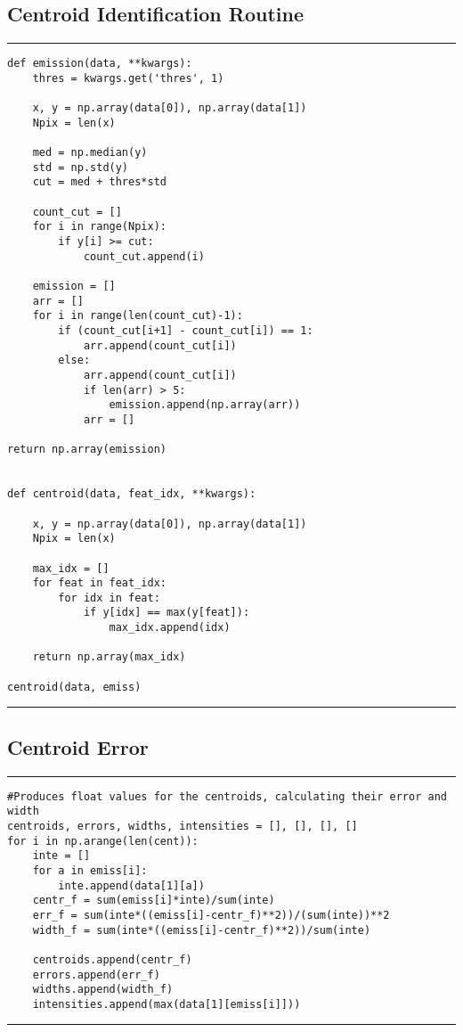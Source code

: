 \documentclass[preprint]{aastex62}
\begin{document}
\subsection{Centroid Identification Routine} \label{code:stats}
\small
\hrule
\begin{lstlisting}
def emission(data, **kwargs):
    thres = kwargs.get('thres', 1)
    
    x, y = np.array(data[0]), np.array(data[1])
    Npix = len(x)
    
    med = np.median(y)
    std = np.std(y)
    cut = med + thres*std
    
    count_cut = []
    for i in range(Npix):
        if y[i] >= cut:
            count_cut.append(i)
    
    emission = []
    arr = []
    for i in range(len(count_cut)-1):
        if (count_cut[i+1] - count_cut[i]) == 1:
            arr.append(count_cut[i])
        else:
            arr.append(count_cut[i])
            if len(arr) > 5:
                emission.append(np.array(arr))
            arr = []

return np.array(emission)


def centroid(data, feat_idx, **kwargs):
    
    x, y = np.array(data[0]), np.array(data[1])
    Npix = len(x)
    
    max_idx = []
    for feat in feat_idx:
        for idx in feat:
            if y[idx] == max(y[feat]):
                max_idx.append(idx)
                
    return np.array(max_idx)

centroid(data, emiss)
\end{lstlisting}
\hrule \vspace{7pt}

\subsection{Centroid Error} \label{code:stats}
\small
\hrule
\begin{lstlisting}
#Produces float values for the centroids, calculating their error and width
centroids, errors, widths, intensities = [], [], [], []
for i in np.arange(len(cent)):
    inte = []
    for a in emiss[i]:
        inte.append(data[1][a])
    centr_f = sum(emiss[i]*inte)/sum(inte)
    err_f = sum(inte*((emiss[i]-centr_f)**2))/(sum(inte))**2
    width_f = sum(inte*((emiss[i]-centr_f)**2))/sum(inte)
    
    centroids.append(centr_f)
    errors.append(err_f)
    widths.append(width_f)
    intensities.append(max(data[1][emiss[i]]))
\end{lstlisting}
\hrule \vspace{7pt}
\end{document}
